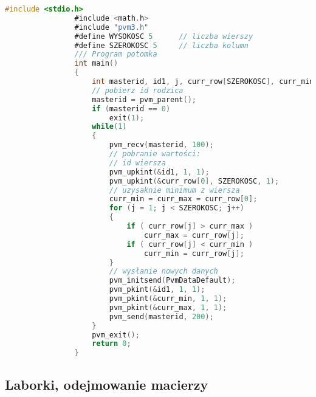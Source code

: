 			\begin{lstlisting}[language={C}]
				#include <stdio.h>
				#include <math.h>
				#include "pvm3.h"
				#define WYSOKOSC 5		// liczba wierszy
				#define SZEROKOSC 5		// liczba kolumn
				/// Program potomka
				int main()
				{
					int masterid, id1, j, curr_row[SZEROKOSC], curr_min, curr_max;
					// pobierz id rodzica 
					masterid = pvm_parent();
					if (masterid == 0)
						exit(1);
					while(1)
					{
						pvm_recv(masterid, 100);
						// pobranie wartości:
						// id wiersza
						pvm_upkint(&id1, 1, 1);
						pvm_upkint(&curr_row[0], SZEROKOSC, 1);
						// uzysaknie minimum z wiersza
						curr_min = curr_max = curr_row[0];
						for (j = 1; j < SZEROKOSC; j++)
						{
							if ( curr_row[j] > curr_max )
								curr_max = curr_row[j];
							if ( curr_row[j] < curr_min )
								curr_min = curr_row[j];
						}
						// wysłanie nowych danych
						pvm_initsend(PvmDataDefault);
						pvm_pkint(&id1, 1, 1);
						pvm_pkint(&curr_min, 1, 1);
						pvm_pkint(&curr_max, 1, 1);
						pvm_send(masterid, 200);
					}
					pvm_exit();
					return 0;
				}
			\end{lstlisting}
		\subsection{Laborki, odejmowanie macierzy}
